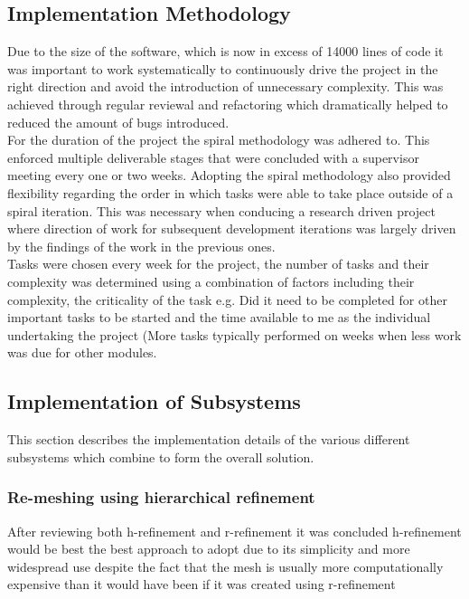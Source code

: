\subsection{Implementation Methodology}
Due to the size of the software, which is now in excess of 14000 lines of code it was important to work systematically to continuously drive the project in the right direction and avoid the introduction of unnecessary complexity. This was achieved through regular reviewal and refactoring which dramatically helped to reduced the amount of bugs introduced. \\

\noindent
For the duration of the project the spiral methodology was adhered to. This enforced multiple deliverable stages that were concluded with a supervisor meeting every one or two weeks. Adopting the spiral methodology also provided flexibility regarding the order in which tasks were able to take place outside of a spiral iteration. This was necessary when conducing a research driven project where direction of work for subsequent development iterations was largely driven by the  findings of the work in the previous ones. \\

\noindent
Tasks were chosen every week for the project, the number of tasks and their complexity was determined using a combination of factors including their complexity, the criticality of the task e.g. Did it need to be completed for other important tasks to be started and the time available to me as the individual undertaking the project (More tasks typically performed on weeks when less work was due for other modules.

\subsection{Implementation of Subsystems}
This section describes the implementation details of the various different subsystems which combine to form the overall solution.

\subsubsection{Re-meshing using hierarchical refinement}
After reviewing both h-refinement \cite{HandPRefinements} and r-refinement \cite{RRefinement} it was concluded h-refinement would be best the best approach to adopt due to its simplicity and more widespread use \cite{HandPRefinements} despite the fact that the mesh is usually more computationally expensive than it would have been if it was created using r-refinement \cite{RRefinement}\\ 

